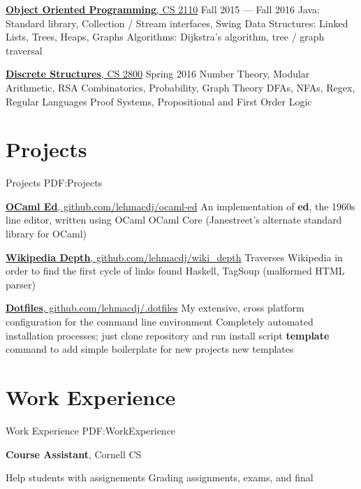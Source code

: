 \documentclass[letterpaper,10pt,oneside]{simpleresumecv}
\begin{document}
\begin{body}
\href{https://www.cs.cornell.edu/courses/cs2110/2015fa/}
{\textbf{Object Oriented Programming}, CS 2110}
\hfill Fall 2015 --- Fall 2016
\BulletItem%
Java: Standard library, Collection / Stream interfaces, Swing
\BulletItem%
Data Structures: Linked Lists, Trees, Heaps, Graphs
\BulletItem%
Algorithms: Dijkstra's algorithm, tree / graph traversal

\href{https://www.cs.cornell.edu/courses/cs2800/2016sp/}
{\textbf{Discrete Structures}, CS 2800}
\hfill Spring 2016
\BulletItem%
Number Theory, Modular Arithmetic, RSA
\BulletItem%
Combinatorics, Probability, Graph Theory
\BulletItem%
DFAs, NFAs, Regex, Regular Languages
\BulletItem%
Proof Systems, Propositional and First Order Logic
\GapNoBreak%



\section%
{Projects}
{Projects}
{PDF:Projects}

\href{https://www.github.com/lehmacdj/ocaml-ed}
{\textbf{OCaml Ed}, github.com/lehmacdj/ocaml-ed}
\BulletItem%
An implementation of \textbf{ed}, the 1960s line editor, written using OCaml
\BulletItem%
OCaml Core (Janestreet's alternate standard library for OCaml)
\GapNoBreak%

\href{https://www.github.com/lehmacdj/wiki_depth}
{\textbf{Wikipedia Depth}, github.com/lehmacdj/wiki\_depth}
\BulletItem%
Traverses Wikipedia in order to find the first cycle of links found
\BulletItem%
Haskell, TagSoup (malformed HTML parser)
\GapNoBreak%

\href{https://www.github.com/lehmacdj/.dotfiles}
{\textbf{Dotfiles}, github.com/lehmacdj/.dotfiles}
\BulletItem%
My extensive, cross platform configuration for the command line environment
\BulletItem%
Completely automated installation processes; just clone repository and run
install script
\BulletItem%
\textbf{template} command to add simple boilerplate for new projects
new templates
\GapNoBreak%

\section%
{Work Experience}
{Work Experience}
{PDF:WorkExperience}

\textbf{Course Assistant}, Cornell CS
\begin{detail}
\SubBulletItem%
Help students with assignements
\SubBulletItem%
Grading assignments, exams, and final
\end{detail}
\GapNoBreak%


\end{body}
\end{document}
